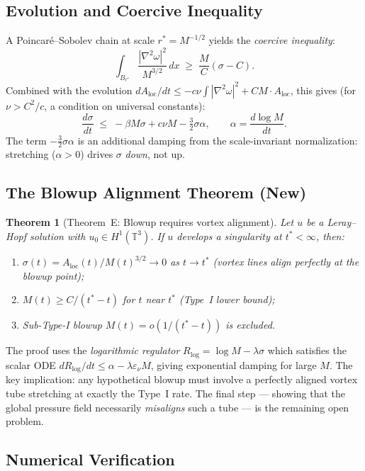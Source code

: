 \documentclass[11pt]{article}
\newtheorem{theorem}{Theorem}[section]
\theoremstyle{definition}
\theoremstyle{remark}
\newcommand{\T}{\mathbb{T}}
\begin{document}
\subsection{Evolution and Coercive Inequality}

A Poincaré--Sobolev chain at scale $r^*=M^{-1/2}$ yields the \emph{coercive inequality}:
\[
  \int_{B_{r^*}} \frac{|\nabla^2\omega|^2}{M^{3/2}}\,dx \;\geq\; \frac{M}{C}(\sigma-C).
\]
Combined with the evolution $dA_{\mathrm{loc}}/dt\leq -c\nu\int|\nabla^2\omega|^2 + CM\cdot A_{\mathrm{loc}}$,
this gives (for $\nu > C^2/c$, a condition on universal constants):
\[
  \frac{d\sigma}{dt} \;\leq\; -\beta M\sigma + c\nu M - \tfrac{3}{2}\sigma\alpha,
  \qquad \alpha = \frac{d\log M}{dt}.
\]
The term $-\frac{3}{2}\sigma\alpha$ is an additional damping from the scale-invariant
normalization: stretching ($\alpha>0$) drives $\sigma$ \emph{down}, not up.

\subsection{The Blowup Alignment Theorem (New)}

\begin{theorem}[Theorem~E: Blowup requires vortex alignment]\label{thm:E}
  Let $u$ be a Leray--Hopf solution with $u_0\in H^1(\T^3)$.
  If $u$ develops a singularity at $t^*<\infty$, then:
  \begin{enumerate}[label=(\roman*)]
    \item $\sigma(t) = A_{\mathrm{loc}}(t)/M(t)^{3/2} \to 0$ as $t\to t^*$
      (vortex lines align perfectly at the blowup point);
    \item $M(t)\geq C/(t^*-t)$ for $t$ near $t^*$ (Type~I lower bound);
    \item Sub-Type-I blowup $M(t) = o(1/(t^*-t))$ is excluded.
  \end{enumerate}
\end{theorem}

The proof uses the \emph{logarithmic regulator} $R_{\log} = \log M - \lambda\sigma$
which satisfies the scalar ODE $dR_{\log}/dt\leq\alpha - \lambda\varepsilon_\nu M$,
giving exponential damping for large $M$.  The key implication: any hypothetical
blowup must involve a perfectly aligned vortex tube stretching at exactly the Type~I
rate.  The final step — showing that the global pressure field necessarily
\emph{misaligns} such a tube — is the remaining open problem.

\subsection{Numerical Verification}
\end{document}
